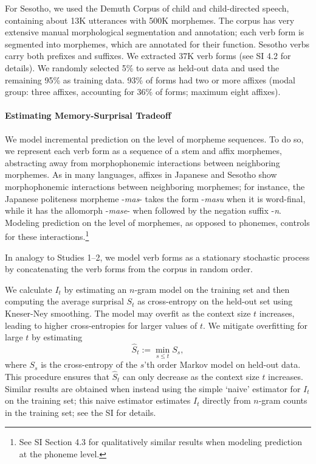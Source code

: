 For Sesotho, we used the Demuth Corpus \citep{demuth1992acquisition} of child and child-directed speech, containing about 13K utterances with 500K morphemes.
The corpus has very extensive manual morphological segmentation and annotation; each verb form is segmented into morphemes, which are annotated for their function.
Sesotho verbs carry both prefixes and suffixes.
We extracted 37K verb forms (see SI 4.2 for details).
We randomly selected 5\% to serve as held-out data and used the remaining 95\% as training data.
93\% of forms had two or more affixes (modal group: three affixes, accounting for 36\% of forms; maximum eight affixes).


\paragraph{Estimating Memory-Surprisal Tradeoff}
We model incremental prediction on the level of morpheme sequences.
To do so, we represent each verb form as a sequence of a stem and affix morphemes, abstracting away from morphophonemic interactions between neighboring morphemes.
As in many languages, affixes in Japanese and Sesotho show morphophonemic interactions between neighboring morphemes; for instance, the Japanese politeness morpheme -\textit{mas}- takes the form -\textit{masu} when it is word-final, while it has the allomorph -\textit{mase}- when followed by the negation suffix -\textit{n}.
Modeling prediction on the level of morphemes, as opposed to phonemes, controls for these interactions.\footnote{See SI Section 4.3 for qualitatively similar results when modeling prediction at the phoneme level.}

In analogy to Studies 1--2, we model verb forms as a stationary stochastic process by concatenating the verb forms from the corpus in random order.

We calculate $I_t$ by estimating an $n$-gram model on the training set and then computing the average surprisal $S_t$ as cross-entropy on the held-out set using Kneser-Ney smoothing.
The model may overfit as the context size $t$ increases, leading to higher cross-entropies for larger values of $t$.
We mitigate overfitting for large $t$ by estimating
\begin{equation}
\hat{S}_t := \min_{s \leq t} S_s,
\end{equation}
where $S_s$ is the cross-entropy of the $s$'th order Markov model on held-out data.
This procedure ensures that $\hat{S}_t$ can only decrease as the context size $t$ increases.
Similar results are obtained when instead using the simple `naive' estimator for $I_t$ on the training set; this naive estimator estimates $I_t$ directly from $n$-gram counts in the training set; see the SI for details.

